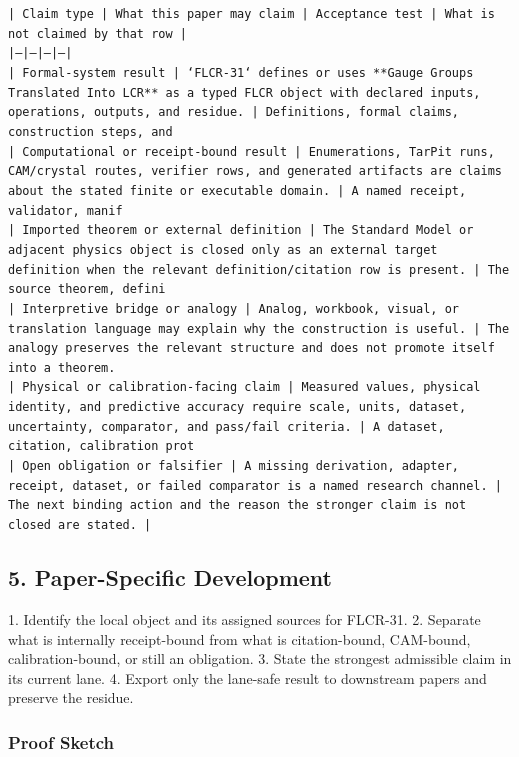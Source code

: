 \documentclass[11pt]{article}
\begin{document}
\noindent\texttt{| Claim type | What this paper may claim | Acceptance test | What is not claimed by that row |}\\
\noindent\texttt{|---|---|---|---|}\\
\noindent\texttt{| Formal-system result | `FLCR-31` defines or uses **Gauge Groups Translated Into LCR** as a typed FLCR object with declared inputs, operations, outputs, and residue. | Definitions, formal claims, construction steps, and}\\
\noindent\texttt{| Computational or receipt-bound result | Enumerations, TarPit runs, CAM/crystal routes, verifier rows, and generated artifacts are claims about the stated finite or executable domain. | A named receipt, validator, manif}\\
\noindent\texttt{| Imported theorem or external definition | The Standard Model or adjacent physics object is closed only as an external target definition when the relevant definition/citation row is present. | The source theorem, defini}\\
\noindent\texttt{| Interpretive bridge or analogy | Analog, workbook, visual, or translation language may explain why the construction is useful. | The analogy preserves the relevant structure and does not promote itself into a theorem. }\\
\noindent\texttt{| Physical or calibration-facing claim | Measured values, physical identity, and predictive accuracy require scale, units, dataset, uncertainty, comparator, and pass/fail criteria. | A dataset, citation, calibration prot}\\
\noindent\texttt{| Open obligation or falsifier | A missing derivation, adapter, receipt, dataset, or failed comparator is a named research channel. | The next binding action and the reason the stronger claim is not closed are stated. | }\\

\subsection*{5. Paper-Specific Development}

1. Identify the local object and its assigned sources for FLCR-31.
2. Separate what is internally receipt-bound from what is citation-bound, CAM-bound, calibration-bound, or still an obligation.
3. State the strongest admissible claim in its current lane.
4. Export only the lane-safe result to downstream papers and preserve the residue.

\subsubsection*{Proof Sketch}
\end{document}
